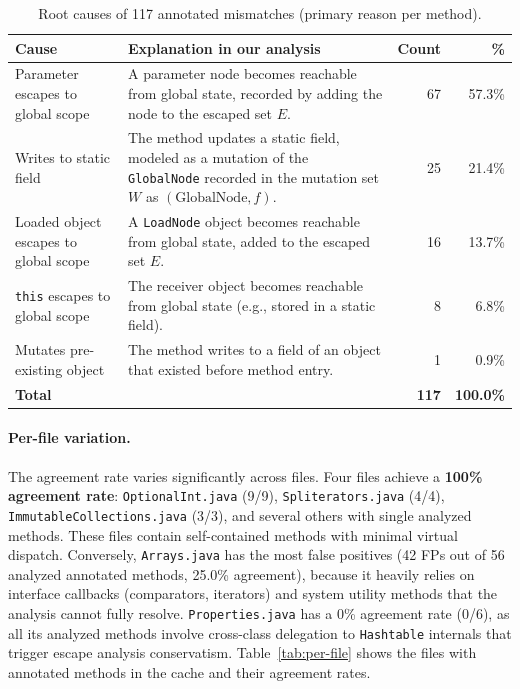\begin{table}[h]
\centering
\caption{Root causes of 117 annotated mismatches (primary reason per method).}
\label{tab:fp-causes}
\begin{tabular}{lp{7.5cm}rr}
\toprule
\textbf{Cause} & \textbf{Explanation in our analysis} & \textbf{Count} & \textbf{\%} \\
\midrule
Parameter escapes to global scope
& A parameter node becomes reachable from global state, recorded by adding the node to the escaped set $E$.
& 67 & 57.3\% \\

Writes to static field
& The method updates a static field, modeled as a mutation of the \texttt{GlobalNode} recorded in the mutation set $W$ as $(\text{GlobalNode}, f)$.
& 25 & 21.4\% \\

Loaded object escapes to global scope
& A \texttt{LoadNode} object becomes reachable from global state, added to the escaped set $E$.
& 16 & 13.7\% \\

\texttt{this} escapes to global scope
& The receiver object becomes reachable from global state (e.g., stored in a static field).
& 8 & 6.8\% \\

Mutates pre-existing object
& The method writes to a field of an object that existed before method entry.
& 1 & 0.9\% \\

\midrule
\textbf{Total} & & \textbf{117} & \textbf{100.0\%} \\
\bottomrule
\end{tabular}
\end{table}

\paragraph{Per-file variation.}
The agreement rate varies significantly across files.
Four files achieve a \textbf{100\% agreement rate}: \texttt{OptionalInt.java} (9/9), \texttt{Spliterators.java} (4/4), \texttt{ImmutableCollections.java} (3/3), and several others with single analyzed methods.
These files contain self-contained methods with minimal virtual dispatch.
Conversely, \texttt{Arrays.java} has the most false positives (42 FPs out of 56 analyzed annotated methods, 25.0\% agreement), because it heavily relies on interface callbacks (comparators, iterators) and system utility methods that the analysis cannot fully resolve.
\texttt{Properties.java} has a 0\% agreement rate (0/6), as all its analyzed methods involve cross-class delegation to \texttt{Hashtable} internals that trigger escape analysis conservatism.
Table~\ref{tab:per-file} shows the files with annotated methods in the cache and their agreement rates.

